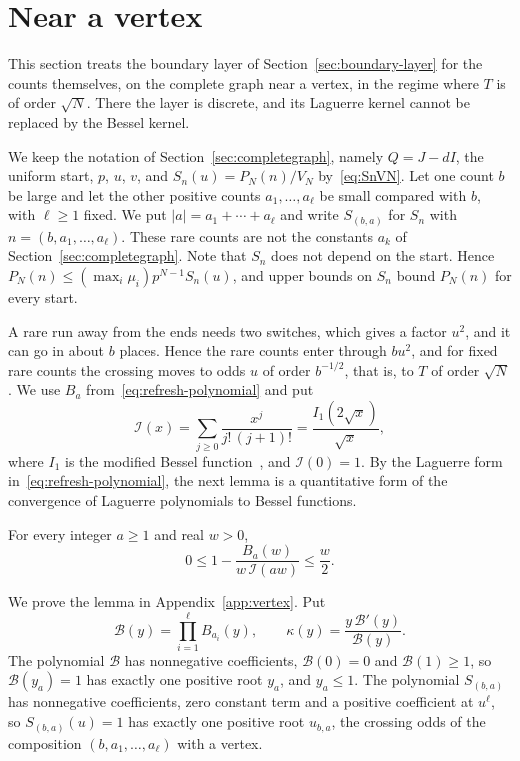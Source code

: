 \section{Near a vertex}\label{sec:vertex}

This section treats the boundary layer of Section~\ref{sec:boundary-layer} for the counts
themselves, on the complete graph near a vertex, in the regime where $T$ is of order $\sqrt N$. There the layer is discrete,
and its Laguerre kernel cannot be replaced by the Bessel kernel.

We keep the notation of Section~\ref{sec:completegraph}, namely $Q=J-dI$, the uniform start,
$p$, $u$, $v$, and $S_n(u)=P_N(n)/V_N$ by~\eqref{eq:SnVN}. Let one count $b$ be large and let
the other positive counts $a_1,\ldots,a_\ell$ be small compared with $b$, with $\ell\ge1$ fixed. We
put $|a|=a_1+\cdots+a_\ell$ and write $S_{(b,a)}$ for $S_n$ with $n=(b,a_1,\ldots,a_\ell)$. These
rare counts are not the constants $a_k$ of Section~\ref{sec:completegraph}. Note that $S_n$ does not
depend on the start. Hence $P_N(n)\le(\max_i\mu_i)p^{N-1}S_n(u)$, and upper bounds on $S_n$ bound $P_N(n)$
for every start.

A rare run away from the ends needs two switches, which gives a factor $u^2$, and it can go in
about $b$ places. Hence the rare counts enter through $bu^2$, and for fixed rare counts the
crossing moves to odds $u$ of order $b^{-1/2}$, that is, to $T$ of order $\sqrt N$. We use $B_a$
from~\eqref{eq:refresh-polynomial} and put
\[
\mathcal I(x)=\sum_{j\ge0}\frac{x^j}{j!\,(j+1)!}=\frac{I_1(2\sqrt x)}{\sqrt x},
\]
where $I_1$ is the modified Bessel function~\cite[Eq.~10.25.2]{dlmf}, and $\mathcal I(0)=1$.
By the Laguerre form in~\eqref{eq:refresh-polynomial}, the next lemma is a quantitative form
of the convergence of Laguerre polynomials to Bessel functions.

\begin{lemma}\label{lem:uniform-laguerre-bessel}
For every integer $a\ge1$ and real $w>0$,
\begin{equation}\label{eq:uniform-laguerre-bessel}
0\le1-\frac{B_a(w)}{w\,\mathcal I(aw)}\le\frac w2 .
\end{equation}
\end{lemma}

We prove the lemma in Appendix~\ref{app:vertex}. Put
\[
\mathcal B(y)=\prod_{i=1}^{\ell}B_{a_i}(y),\qquad
\kappa(y)=\frac{y\,\mathcal B'(y)}{\mathcal B(y)} .
\]
The polynomial $\mathcal B$ has nonnegative coefficients, $\mathcal B(0)=0$ and
$\mathcal B(1)\ge1$, so $\mathcal B(y_a)=1$ has exactly one positive root $y_a$, and $y_a\le1$.
The polynomial $S_{(b,a)}$ has nonnegative coefficients, zero constant term and a positive
coefficient at $u^\ell$, so $S_{(b,a)}(u)=1$ has exactly one positive root $u_{b,a}$, the
crossing odds of the composition $(b,a_1,\ldots,a_\ell)$ with a vertex.

